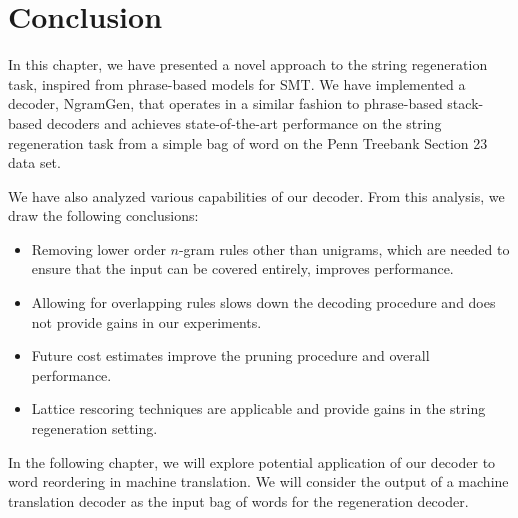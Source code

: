 \section{Conclusion}

In this chapter, we have presented a novel approach to the string regeneration
task, inspired from phrase-based models for SMT.
We have implemented a decoder, NgramGen, that operates in a similar fashion to phrase-based
stack-based decoders and achieves state-of-the-art
performance on the string regeneration task from a simple bag of word on the Penn Treebank
Section 23 data set.

We have also analyzed various capabilities of our decoder.
From this analysis, we draw the following conclusions:
%
\begin{itemize}
  \item Removing lower order $n$-gram rules other than unigrams, which are needed to ensure that the input can be covered entirely, improves performance.
  \item Allowing for overlapping rules slows down the decoding procedure and
    does not provide gains in our experiments.
  \item Future cost estimates improve the pruning procedure and overall performance.
  \item Lattice rescoring techniques are applicable and provide gains in the string
    regeneration setting.
\end{itemize}


In the following chapter, we will explore potential application of our decoder
to word reordering in machine translation. We will consider the output of
a machine translation decoder as the input bag of words for the regeneration decoder.


%

